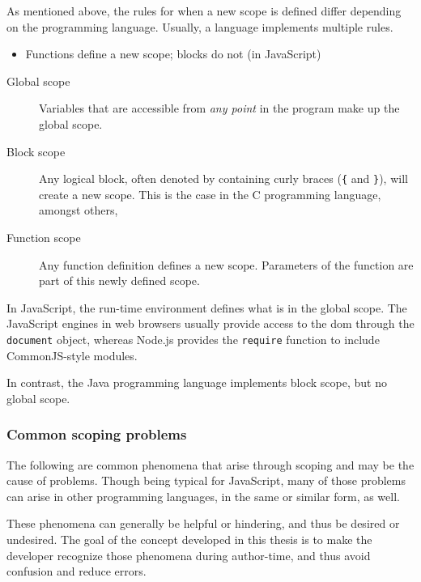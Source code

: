 As mentioned above, the rules for when a new scope is defined differ
depending on the programming language. Usually, a language implements
multiple rules.

\begin{itemize}
\itemsep1pt\parskip0pt
\item
  Functions define a new scope; blocks do not (in JavaScript)
\end{itemize}

\begin{description}
\item[Global scope]
Variables that are accessible from \emph{any point} in the program make
up the global scope.
\item[Block scope]
Any logical block, often denoted by containing curly braces (\texttt{\{}
and \texttt{\}}), will create a new scope. This is the case in the C
programming language, amongst others,
\item[Function scope]
Any function definition defines a new scope. Parameters of the function
are part of this newly defined scope.
\end{description}

In JavaScript, the run-time environment defines what is in the global
scope. The JavaScript engines in web browsers usually provide access to
the \ac{dom} through the \texttt{document} object, whereas Node.js
provides the \texttt{require} function to include CommonJS-style
modules.

In contrast, the Java programming language implements block scope, but
no global scope.

\subsubsection{Common scoping problems}\label{common-scoping-problems}

The following are common phenomena that arise through scoping and may be
the cause of problems. Though being typical for JavaScript, many of
those problems can arise in other programming languages, in the same or
similar form, as well.

These phenomena can generally be helpful or hindering, and thus be
desired or undesired. The goal of the concept developed in this thesis
is to make the developer recognize those phenomena during author-time,
and thus avoid confusion and reduce errors.

